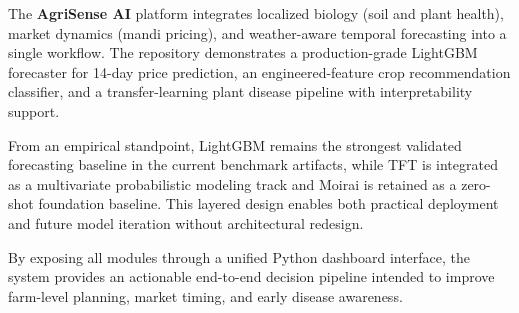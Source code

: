\documentclass[conference]{IEEEtran}
\begin{document}
The \textbf{AgriSense AI} platform integrates localized biology (soil and plant health), market dynamics (mandi pricing), and weather-aware temporal forecasting into a single workflow. The repository demonstrates a production-grade LightGBM forecaster for 14-day price prediction, an engineered-feature crop recommendation classifier, and a transfer-learning plant disease pipeline with interpretability support.

From an empirical standpoint, LightGBM remains the strongest validated forecasting baseline in the current benchmark artifacts, while TFT is integrated as a multivariate probabilistic modeling track and Moirai is retained as a zero-shot foundation baseline. This layered design enables both practical deployment and future model iteration without architectural redesign.

By exposing all modules through a unified Python dashboard interface, the system provides an actionable end-to-end decision pipeline intended to improve farm-level planning, market timing, and early disease awareness.
\end{document}
